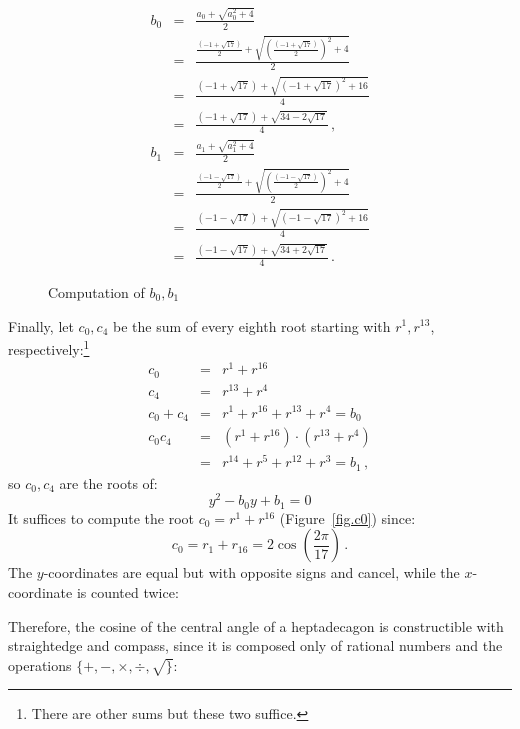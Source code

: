 \documentclass[11pt,a4paper]{article}
\newenvironment{form}[1]{%
\begin{displaymath}%
\renewcommand{\arraystretch}{#1}%
\begin{array}{lcl}}%
{\end{array}%
\end{displaymath}%
}
\newcommand*{\disfrac}[2]{\displaystyle\frac{#1}{#2}}
\begin{document}
\begin{figure}
\begin{form}{2.7}
b_0&=&\disfrac{a_0+\sqrt{a_0^2+4}}{2}\\
&=&\disfrac{
     \disfrac{(-1+\sqrt{17})}{2} + 
     \sqrt{\left(\disfrac{(-1+\sqrt{17})}{2}\right)^2+4}
   }{2}\\
&=&\disfrac{
     (-1+\sqrt{17}) + 
     \sqrt{\left(-1+\sqrt{17}\right)^2+16}
   }{4}\\
&=&\disfrac{
     (-1+\sqrt{17}) + 
     \sqrt{34-2\sqrt{17}}
   }{4}\,,\\
b_1&=&\disfrac{a_1+\sqrt{a_1^2+4}}{2}\\
&=&\disfrac{
     \disfrac{(-1-\sqrt{17})}{2} + 
     \sqrt{\left(\disfrac{(-1-\sqrt{17})}{2}\right)^2+4}
   }{2}\\
&=&\disfrac{
     (-1-\sqrt{17}) + 
     \sqrt{\left(-1-\sqrt{17}\right)^2+16}
   }{4}\\
&=&\disfrac{
     (-1-\sqrt{17}) + 
     \sqrt{34+2\sqrt{17}}
   }{4}\,.
\end{form}\vspace{-2em}
\caption{Computation of $b_0,b_1$}\label{fig.b01}
\end{figure}
Finally, let $c_0,c_4$ be the sum of every eighth root starting with $r^1,r^{13}$, respectively:\footnote{There are other sums but these two suffice.}
\begin{form}{1.4}
c_0&=&r^1+r^{16}\\
c_4&=&r^{13}+r^4\\
c_0+c_4&=&r^1+r^{16}+r^{13}+r^4=b_0\\
c_0c_4&=&(r^1+r^{16})\cdot(r^{13}+r^4)\\
&=&r^{14}+r^5+r^{12}+r^3=b_1\,,
\end{form}
so $c_0,c_4$ are the roots of:
\[
y^2-b_0y+b_1=0
\]
It suffices to compute the root $c_0=r^1+r^{16}$
(Figure~\ref{fig.c0}) since:
\[
c_0=r_1+r_{16}=2\cos\left(\frac{2\pi}{17}\right)\,.
\]
The $y$-coordinates are equal but with opposite signs and cancel, while the $x$-coordinate is counted twice:
\begin{center}
\end{center}
Therefore, the cosine of the central angle of a heptadecagon is constructible with straightedge and compass, since it is composed only of rational numbers and the operations $\{+,-,\times,\div,\surd\}$:
\end{document}
